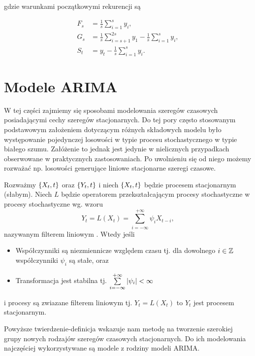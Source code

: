 \documentclass[10pt,a4paper]{book}
\begin{document}
gdzie warunkami początkowymi rekurencji są 

\begin{align*}
F_s &= \frac{1}{s} \sum_{i=1}^{s} y_i,\\
G_s &= \frac{1}{s} \sum_{i=s+1}^{2s} y_1 - \frac{1}{s} \sum_{i=1}^{s} y_i,\\
S_t &= y_t - \frac{1}{s} \sum_{i=1}^{s} y_i.
\end{align*}

\chapter{Modele ARIMA}

W tej części zajmiemy się sposobami modelowania szeregów czasowych posiadającymi cechy szeregów stacjonarnych. Do tej pory często stosowanym podstawowym założeniem dotyczącym różnych składowych modelu było występowanie pojedynczej losowości w typie procesu stochastycznego w typie białego szumu. Załóżenie to jednak jest jedynie w nielicznych przypadkach obserwowane w praktycznych zastosowaniach. Po uwolnieniu się od niego możemy rozważać np. losowości generujące liniowe stacjonarne szeregi czasowe.

\begin{definition} \label{definition-linear-stationary-model}
Rozważmy $\left\lbrace {{X_t}, {t}} \right\rbrace$ oraz $\left\lbrace {{Y_t}, {t}} \right\rbrace$ i niech $\left\lbrace {{X_t}, {t}} \right\rbrace$ będzie procesem stacjonarnym (słabym). Niech $L$ będzie operatorem przekształcającym procesy stochastyczne w procesy stochastyczne wg. wzoru
$$
Y_t = L(X_t) = \sum_{i=-\infty}^{+\infty} \psi_i X_{t-i},
$$
nazywanym filterem liniowym . Wtedy jeśli
\begin{itemize}
\item Współczynniki są niezmiennicze względem czasu tj. dla dowolnego $i \in \mathbb{Z}$ współczynniki $\psi_i$ są stałe, oraz
\item Transformacja jest stabilna tj. $ \sum_{i=-\infty}^{+\infty}\abs{\psi_i} < \infty$
\end{itemize}
i procesy są zwiazane filterem liniowym tj. $Y_t = L(X_t)$ to $Y_t$ jest procesem stacjonarnym.
\end{definition} 

Powyższe twierdzenie-definicja wskazuje nam metodę na tworzenie szerokiej grupy nowych rodzajów szeregów czasowych stacjonarnych. Do ich modelowania najczęściej wykorzystywane są modele z rodziny modeli ARIMA.
\end{document}
